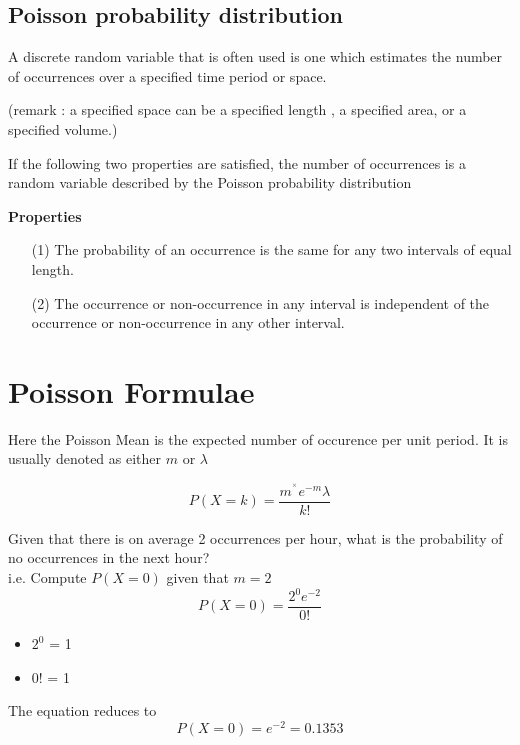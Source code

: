 \documentclass[]{article}
\begin{document}
\tableofcontents

\newpage
\Large

\subsection{Poisson probability distribution}

A discrete random variable that is often used is one which estimates the number of occurrences  over a specified time period or space.

(remark : a specified space can be a specified length , a specified area, or a specified volume.)

If the following two properties are satisfied, the number of occurrences is a random variable described by the Poisson probability distribution

\noindent \textbf{Properties}
\begin{itemize}
\item[(1)]      The probability of an occurrence is the same for any two intervals of equal length.\\
\item[(2)]     The occurrence or non-occurrence in any interval is independent of the occurrence or non-occurrence in any other interval.
\end{itemize}


\newpage
\section{Poisson Formulae}

Here the Poisson Mean is the expected number of occurence per unit period. It is usually denoted as either $m$ or $\lambda$


\[ P(X=k) = \frac{m^^ \times e^{-m}  \lambda }{k!}  \]


	Given that there is on average 2 occurrences per hour, what is the probability of no occurrences in the next hour? \\ i.e. Compute $P(X=0)$ given that $m=2$
	\Large
	\[ P(X = 0)=\frac{2^0 e^{-2}}{0!} \]
	\normalsize
	\begin{itemize}
		\item $2^0$ = 1
		\item $0!$ = 1
	\end{itemize}
	The equation reduces to
	\[ P(X = 0)=e^{-2} = 0.1353\]
\end{document}
